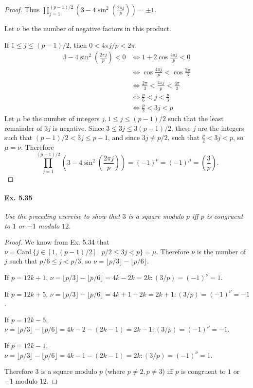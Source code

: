 \documentclass[11pt,a4paper]{article}
\newcommand{\legendre}[2]{\genfrac{(}{)}{}{}{#1}{#2}}
\begin{document}
\begin{proof}
Thus $\prod_{j=1}^{(p-1)/2}  \left(3-4 \sin^2\left(\frac{2 \pi j}{p}\right)\right)= \pm 1$.

Let $\nu$ be the number of negative factors in this product.

If $1 \leq j \leq (p-1)/2$, then $0 < 4\pi j/p < 2 \pi$.
\begin{align*}
3-4 \sin^2\left(\frac{2 \pi j}{p}\right)<0 &\iff 1 + 2 \cos \frac{4\pi j}{p} <0\\
 &\iff \cos \frac{4\pi j}{p} < \cos \frac{2\pi}{3}\\
&\iff \frac{2\pi}{3} < \frac{4 \pi j}{p} < \frac{4 \pi}{3}\\
&\iff \frac{p}{6} < j < \frac{p}{3}\\
& \iff \frac{p}{2} < 3j < p
\end{align*}
Let $\mu$ be the number of integers $j, 1 \leq j \leq (p-1)/2$ such that the least remainder of $3j$ is negative. Since $3 \leq 3j \leq 3 (p-1)/2$, these $j$ are the integers such that  $(p-1)/2 < 3j \leq p-1$, and since $3j \ne p/2$, such that $\frac{p}{2} < 3j < p$, so $\mu = \nu$.
Therefore
$$\prod_{j=1}^{(p-1)/2} \left(3-4 \sin^2\left(\frac{2 \pi j}{p}\right)\right)  =(-1)^\nu = (-1)^\mu = \legendre{3}{p}.$$
\end{proof}

\paragraph{Ex. 5.35}

{\it Use the preceding exercise to show that $3$ is a square modulo $p$ iff $p$ is congruent to $1$ or $-1$ modulo $12$.
}

\begin{proof}
We know from Ex. 5.34 that $\nu = \mathrm{Card}\, \{j \in [1,(p-1)/2] \ \vert \ p/2 \leq 3j < p\} = \mu$. 
Therefore $\nu$ is the number of $j$ such that $p/6 \leq j < p/3$, so $\nu =\lfloor p/3 \rfloor - \lfloor p/6 \rfloor $.

If $p = 12k +1$, $\nu = \lfloor p/3 \rfloor - \lfloor p/6 \rfloor = 4k - 2k = 2k :  (3/p) = (-1)^\nu = 1$.

If $p = 12k +5$, $\nu = \lfloor p/3 \rfloor - \lfloor p/6 \rfloor = 4k + 1 - 2k = 2k + 1:  (3/p) = (-1)^\nu = -1$.

If $p = 12k - 5$, $\nu = \lfloor p/3 \rfloor - \lfloor p/6 \rfloor = 4k - 2 - (2k-1) = 2k -1:  (3/p) = (-1)^\nu = -1$.

If $p = 12k  - 1$, $\nu = \lfloor p/3 \rfloor - \lfloor p/6 \rfloor = 4k  - 1 - (2k-1) = 2k :  (3/p) = (-1)^\nu = 1$.

Therefore $3$ is a square modulo $p$ (where $p\ne 2, p \ne 3$)  iff $p$ is congruent to $1$ or $-1$ modulo $12$.
\end{proof}
\end{document}
